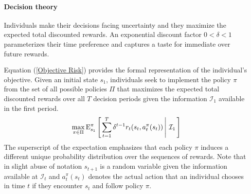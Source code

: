 \paragraph{Decision theory} Individuals make their decisions facing uncertainty and they maximize the expected total discounted rewards. An exponential discount factor $0 < \delta < 1$ parameterizes their time preference and captures a taste for immediate over future rewards.

Equation (\ref{Objective Risk}) provides the formal representation of the individual's objective. Given an initial state $s_1$, individuals seek to implement the policy $\pi$ from the set of all possible policies $\Pi$ that maximizes the expected total discounted rewards over all $T$ decision periods given the information $\mathcal{I}_1$ available in the first period.
%
\begin{align}\label{Objective Risk}
\max_{\pi \in\Pi} \mathrm{E}_{s_1}^\pi\left[\left.\sum^{T}_{t = 1}  \delta^{t - 1} r_t(s_t, a^\pi_t(s_t))\,\right\vert\,\mathcal{I}_1\,\right]
\end{align}
%
The superscript of the expectation emphasizes that each policy $\pi$ induces a different unique probability distribution over the sequences of rewards. Note that in slight abuse of notation $s_{t + 1}$ is a random variable given the information available at $\mathcal{I}_t$ and $a^\pi_{t}(s_{t})$ denotes the actual action that an individual chooses in time $t$ if they encounter $s_{t}$ and follow policy $\pi$.
